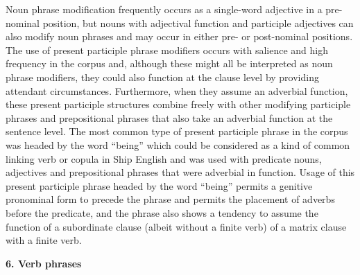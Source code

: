 \begin{styleStandard}
Noun phrase modification frequently occurs as a single-word adjective in a pre-nominal position, but nouns with adjectival function and participle adjectives can also modify noun phrases and may occur in either pre- or post-nominal positions. The use of present participle phrase modifiers occurs with salience and high frequency in the corpus and, although these might all be interpreted as noun phrase modifiers, they could also function at the clause level by providing attendant circumstances. Furthermore, when they assume an adverbial function, these present participle structures combine freely with other modifying participle phrases and prepositional phrases that also take an adverbial function at the sentence level. The most common type of present participle phrase in the corpus was headed by the word “being” which could be considered as a kind of common linking verb or copula in Ship English and was used with predicate nouns, adjectives and prepositional phrases that were adverbial in function. Usage of this present participle phrase headed by the word “being” permits a genitive pronominal form to precede the phrase and permits the placement of adverbs before the predicate, and the phrase also shows a tendency to assume the function of a subordinate clause (albeit without a finite verb) of a matrix clause with a finite verb. 
\end{styleStandard}

\clearpage\begin{styleStandard}
\textbf{6. Verb phrases}
\end{styleStandard}

